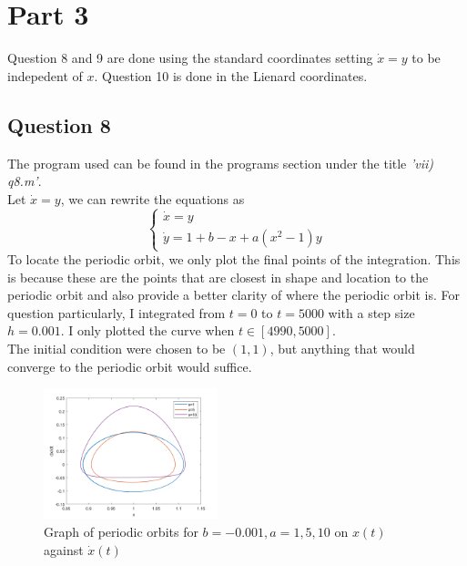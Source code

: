 \documentclass[10pt]{article}
\begin{document}
\newpage
\section*{Part 3}
Question 8 and 9 are done using the standard coordinates setting $\dot{x}=y$ to be indepedent of $x$. Question 10 is done in the Lienard coordinates.
\subsection*{Question 8}
The program used can be found in the programs section under the title \emph{'vii) q8.m'}.\\
Let $\dot{x}=y$, we can rewrite the equations as
\[\left
\{\begin{array}{lr}
\dot{x}=y\\
\dot{y}=1+b-x+a(x^2-1)y
\end{array}
\right.\]
To locate the periodic orbit, we only plot the final points of the integration. This is because these are the points that are closest in shape and location to the periodic orbit and also provide a better clarity of where the periodic orbit is. For question particularly, I integrated from $t=0$ to $t=5000$ with a step size $h=0.001$. I only plotted the curve when $t\in[4990,5000]$.\\
The initial condition were chosen to be $(1,1)$, but anything that would converge to the periodic orbit would suffice.
\begin{figure}[H]
\centering
\includegraphics[width=0.45\textwidth]{Files/q8.png}
\caption{Graph of periodic orbits for $b=-0.001,a=1,5,10$ on $x(t)$ against $\dot{x}(t)$}
\end{figure}
\end{document}
